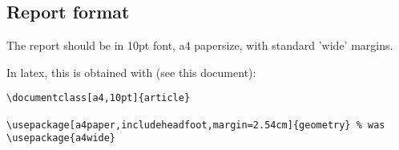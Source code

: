 \documentclass[a4,10pt]{article}
\begin{document}
\subsection*{Report format}
The report should be in 10pt font, a4 papersize, with standard 'wide' margins.

In latex, this is obtained with (see this document):
\begin{verbatim}
\documentclass[a4,10pt]{article}

\usepackage[a4paper,includeheadfoot,margin=2.54cm]{geometry} % was \usepackage{a4wide}
\end{verbatim}
\end{document}
